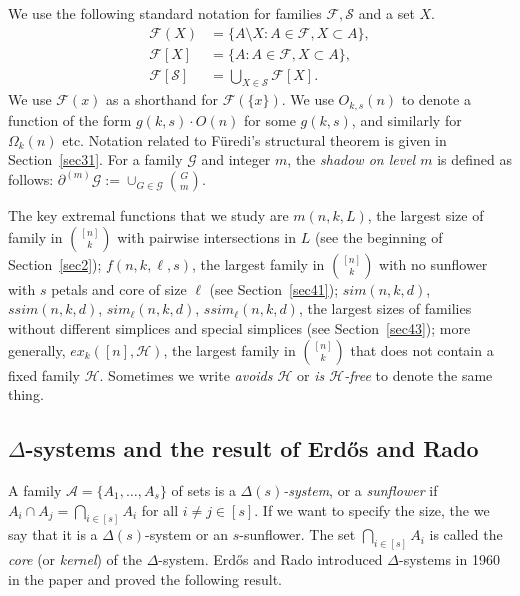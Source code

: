 \documentclass[graybox]{svmult}
\newcommand{\ff}{\mathcal{F}}
\newcommand{\aaa}{\mathcal{A}}
\newcommand{\m}{\mathcal}
\begin{document}
We use the following standard notation for families $\ff, \m S$ and a set $X$.
\begin{align*}
  \ff(X) &= \big\{A\setminus X: A\in \ff, X\subset A\big\}, \\
  \ff[X] &= \big\{A: A\in \ff, X\subset A\big\}, \\
  \ff[\m S] &= \bigcup_{X\in \m S}\ff[X].
\end{align*}
We use $\ff(x)$ as a shorthand for $\ff(\{x\})$. We use $O_{k,s}(n)$ to denote a function of the form $g(k,s)\cdot O(n)$ for some $g(k,s)$, and similarly for $\Omega_k(n)$ etc. Notation related to F\"uredi's structural theorem is given in Section~\ref{sec31}. For a family $\m G$ and integer $m$, the {\it shadow on level $m$} is defined as follows: $\partial^{(m)}\m G:= \cup_{G\in \m G}{G\choose m}$.


The key extremal functions that we study are $m(n,k,L)$, the largest size of family in  ${[n]\choose k}$ with pairwise intersections in $L$ (see the beginning of Section~\ref{sec2}); $f(n,k,\ell,s)$, the largest family in ${[n]\choose k}$ with no sunflower with $s$ petals and core of size $\ell$ (see Section~\ref{sec41}); $sim(n,k,d)$, $ssim(n,k,d)$, $sim_\ell(n,k,d)$, $ssim_\ell(n,k,d)$, the largest sizes of families without different simplices and special simplices (see Section~\ref{sec43});  more generally, $ex_k([n],\m H)$, the largest family in ${[n]\choose k}$ that does not contain a fixed family $\m H$. Sometimes we write {\it avoids $\m H$} or {\it is $\m H$-free} to denote the same thing.

\subsection{$\Delta$-systems and the result of Erd\H os and Rado} A family $\aaa = \{A_1,\ldots, A_s\}$ of sets is a {\em $\Delta(s)$-system}, or a {\it sunflower} if $A_i\cap A_j = \bigcap_{i\in [s]}A_i$ for all $i\ne j\in [s]$. If we want to specify the size, the we say that it is a $\Delta(s)$-system or an $s$-sunflower. The set $\bigcap_{i\in [s]}A_i$ is called the {\em core} (or {\em kernel}) of the $\Delta$-system. Erd\H os and Rado introduced $\Delta$-systems in 1960 in the paper \cite{ER} and proved the following result.
\end{document}

